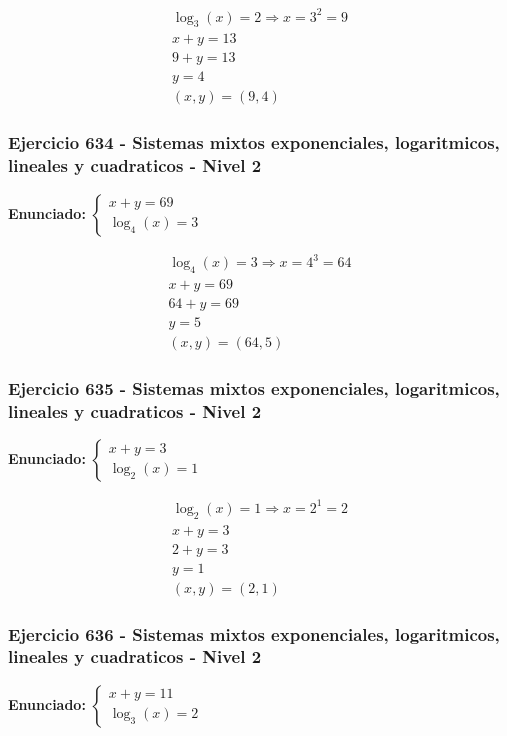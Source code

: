 \documentclass[12pt,a4paper]{article}
\begin{document}
\[
\begin{aligned}
\log_{3}\left(x\right)=2\Rightarrow x=3^{2}=9\\
x+y=13\\
9+y=13\\
y=4\\
\boxed{(x,y)=(9,4)}
\end{aligned}
\]


\subsubsection*{Ejercicio 634 - Sistemas mixtos exponenciales, logaritmicos, lineales y cuadraticos - Nivel 2}
\textbf{Enunciado:} \(\begin{cases} x+y=69\\ \log_{4}\left(x\right)=3\end{cases}\)

\[
\begin{aligned}
\log_{4}\left(x\right)=3\Rightarrow x=4^{3}=64\\
x+y=69\\
64+y=69\\
y=5\\
\boxed{(x,y)=(64,5)}
\end{aligned}
\]


\subsubsection*{Ejercicio 635 - Sistemas mixtos exponenciales, logaritmicos, lineales y cuadraticos - Nivel 2}
\textbf{Enunciado:} \(\begin{cases} x+y=3\\ \log_{2}\left(x\right)=1\end{cases}\)

\[
\begin{aligned}
\log_{2}\left(x\right)=1\Rightarrow x=2^{1}=2\\
x+y=3\\
2+y=3\\
y=1\\
\boxed{(x,y)=(2,1)}
\end{aligned}
\]


\subsubsection*{Ejercicio 636 - Sistemas mixtos exponenciales, logaritmicos, lineales y cuadraticos - Nivel 2}
\textbf{Enunciado:} \(\begin{cases} x+y=11\\ \log_{3}\left(x\right)=2\end{cases}\)
\end{document}
